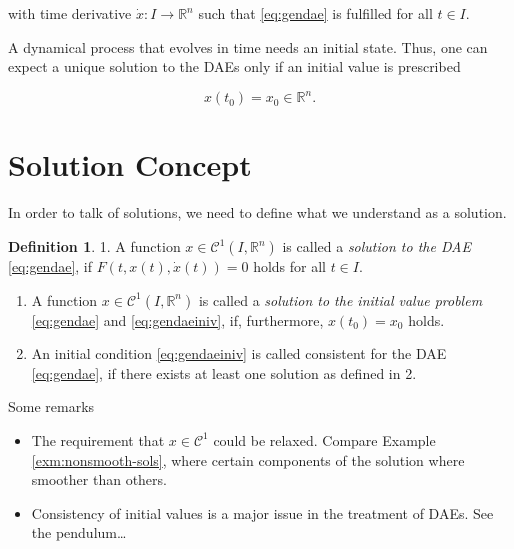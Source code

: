 \documentclass[]{book}
\providecommand{\tightlist}{%
  \setlength{\itemsep}{0pt}\setlength{\parskip}{0pt}}
\theoremstyle{definition}
\newtheorem{definition}{Definition}[chapter]
\theoremstyle{definition}
\theoremstyle{definition}
\theoremstyle{remark}
\begin{document}
with time derivative \(\dot x \colon I \to \mathbb R^{n}\) such that \eqref{eq:gendae} is fulfilled for all \(t\in I\).

A dynamical process that evolves in time needs an initial state. Thus, one can expect a unique solution to the DAEs only if an initial value is prescribed

\begin{equation}
    x(t_0) = x_0 \in \mathbb R^{n}. \label{eq:gendaeiniv} 
\end{equation}

\hypertarget{solution-concept}{%
\section{Solution Concept}\label{solution-concept}}

In order to talk of solutions, we need to define what we understand as a solution.

\begin{definition}
\protect\hypertarget{def:dae-solution}{}{\label{def:dae-solution} } 1. A function \(x \in \mathcal C^1(I, \mathbb R^{n})\) is called a \emph{solution to the DAE} \eqref{eq:gendae}, if \(F(t, x(t), \dot x(t)) = 0\) holds for all \(t\in I\).

\begin{enumerate}
\def\labelenumi{\arabic{enumi}.}
\setcounter{enumi}{1}
\item
  A function \(x \in \mathcal C^1(I, \mathbb R^{n})\) is called a \emph{solution to the initial value problem} \eqref{eq:gendae} and \eqref{eq:gendaeiniv}, if, furthermore, \(x(t_0)= x_0\) holds.
\item
  An initial condition \eqref{eq:gendaeiniv} is called consistent for the DAE \eqref{eq:gendae}, if there exists at least one solution as defined in 2.
\end{enumerate}
\end{definition}

Some remarks

\begin{itemize}
\tightlist
\item
  The requirement that \(x \in \mathcal C^1\) could be relaxed. Compare Example \ref{exm:nonsmooth-sols}, where certain components of the solution where smoother than others.
\item
  Consistency of initial values is a major issue in the treatment of DAEs. See the pendulum\ldots{}
\end{itemize}
\end{document}
